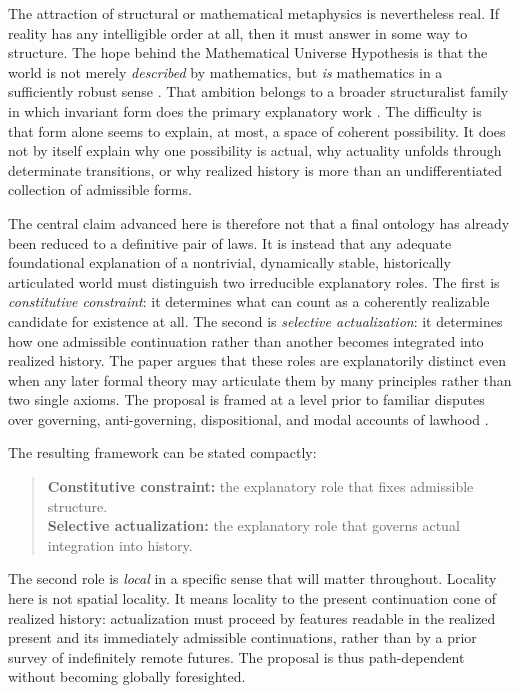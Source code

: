 \documentclass[11pt]{article}
\theoremstyle{foundation}
\begin{document}
The attraction of structural or mathematical metaphysics is nevertheless real. If reality has any intelligible order at all, then it must answer in some way to structure. The hope behind the Mathematical Universe Hypothesis is that the world is not merely \emph{described} by mathematics, but \emph{is} mathematics in a sufficiently robust sense \citep{Tegmark2008}. That ambition belongs to a broader structuralist family in which invariant form does the primary explanatory work \citep{Worrall1989,Ladyman1998,Shapiro1997,French2014,LadymanRoss2007}. The difficulty is that form alone seems to explain, at most, a space of coherent possibility. It does not by itself explain why one possibility is actual, why actuality unfolds through determinate transitions, or why realized history is more than an undifferentiated collection of admissible forms.

The central claim advanced here is therefore not that a final ontology has already been reduced to a definitive pair of laws. It is instead that any adequate foundational explanation of a nontrivial, dynamically stable, historically articulated world must distinguish two irreducible explanatory roles. The first is \emph{constitutive constraint}: it determines what can count as a coherently realizable candidate for existence at all. The second is \emph{selective actualization}: it determines how one admissible continuation rather than another becomes integrated into realized history. The paper argues that these roles are explanatorily distinct even when any later formal theory may articulate them by many principles rather than two single axioms. The proposal is framed at a level prior to familiar disputes over governing, anti-governing, dispositional, and modal accounts of lawhood \citep{Armstrong1983,Dretske1977,Tooley1977,vanFraassen1989,Bird2007,Ellis2001,Mumford2004,Maudlin2007}.

The resulting framework can be stated compactly:

\begin{quote}
\textbf{Constitutive constraint:} the explanatory role that fixes admissible structure.\\
\textbf{Selective actualization:} the explanatory role that governs actual integration into history.
\end{quote}

The second role is \emph{local} in a specific sense that will matter throughout. Locality here is not spatial locality. It means locality to the present continuation cone of realized history: actualization must proceed by features readable in the realized present and its immediately admissible continuations, rather than by a prior survey of indefinitely remote futures. The proposal is thus path-dependent without becoming globally foresighted.
\end{document}

